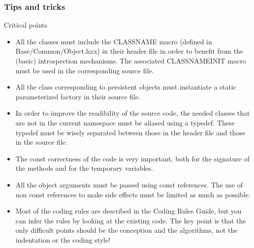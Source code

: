 \documentclass[8pt]{beamer}
\begin{document}
\begin{frame}
  \frametitle{Tips and tricks}
  \begin{block}{Critical points}
    \begin{itemize}
    \item All the classes must include the {\ttfamily CLASSNAME} macro (defined in Base/Common/Object.hxx) in their header file in order to benefit from the (basic) introspection mechanisms. The associated {\ttfamily CLASSNAMEINIT} macro must be used in the corresponding source file.
    \item All the class corresponding to persistent objects must instantiate a static parameterized factory in their source file.
      \item In order to improve the readibility of the source code, the needed classes that are not in the current namespace must be aliased using a typedef. These typedef must be wisely separated between those in the header file and those in the source file.
      \item The const correctness of the code is very important, both for the signature of the methods and for the temporary variables.
      \item All the object arguments must be passed using const references. The use of non const references to make side effects must be limited as much as possible.
      \item Most of the coding rules are described in the Coding Rules Guide, but you can infer the rules by looking at the existing code. \alert{The key point is that the only difficult points should be the conception and the algorithms, not the indentation or the coding style!}
    \end{itemize}
  \end{block}
\end{frame}
\end{document}
